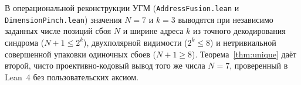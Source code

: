 \begin{remark}
В операциональной реконструкции УГМ (\texttt{AddressFusion.lean} и
\texttt{DimensionPinch.lean}) значения $N=7$ и $k=3$ выводятся при независимо
заданных числе позиций сбоя $N$ и ширине адреса $k$ из точного декодирования
синдрома ($N+1\le 2^k$), двухполярной видимости ($2^k\le 8$) и нетривиальной
совершенной упаковки одиночных сбоев ($N+1\ge 8$). Теорема~\ref{thm:unique}
даёт второй, чисто проективно-кодовый вывод того же числа $N=7$, проверенный в
Lean~4 без пользовательских аксиом. 
\end{remark}
